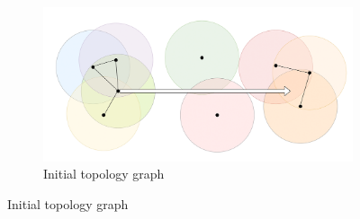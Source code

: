 \begin{figure}
\centering

\begin{subfigure}{0.4\textwidth}
\includegraphics[width=\linewidth]{images/manet_topology_1.png}
\caption{Initial topology graph} \label{fig:2_2a}
\end{subfigure}

\vspace*{0.5cm} %


\end{figure}
